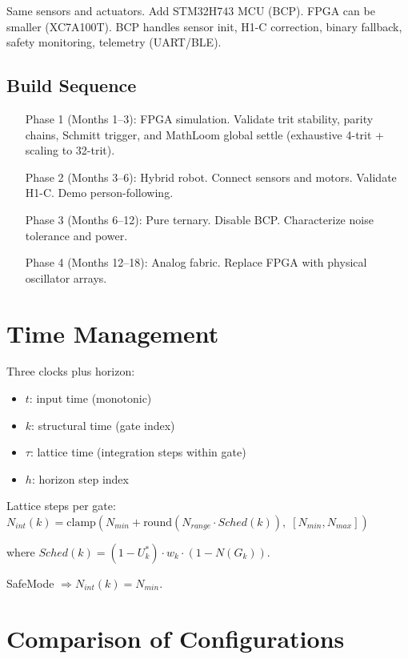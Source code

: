 \documentclass[11pt, a4paper]{report}
\begin{document}
Same sensors and actuators. Add STM32H743 MCU (BCP). FPGA can be smaller
(XC7A100T). BCP handles sensor init, H1-C correction, binary fallback,
safety monitoring, telemetry (UART/BLE).

\section{Build Sequence}

\begin{enumerate}[label=\textbf{Phase \arabic*} (Months \arabic*--\arabic*):, start=1]
  \item[Phase 1 (Months 1--3):] FPGA simulation. Validate trit stability, parity chains, Schmitt trigger, and MathLoom global settle (exhaustive 4-trit + scaling to 32-trit).
  \item[Phase 2 (Months 3--6):] Hybrid robot. Connect sensors and motors. Validate H1-C. Demo person-following.
  \item[Phase 3 (Months 6--12):] Pure ternary. Disable BCP. Characterize noise tolerance and power.
  \item[Phase 4 (Months 12--18):] Analog fabric. Replace FPGA with physical oscillator arrays.
\end{enumerate}

\chapter{Time Management}

Three clocks plus horizon:
\begin{itemize}[nosep]
  \item $t$: input time (monotonic)
  \item $k$: structural time (gate index)
  \item $\tau$: lattice time (integration steps within gate)
  \item $h$: horizon step index
\end{itemize}

Lattice steps per gate:
$N_{int}(k) = \text{clamp}(N_{min} + \text{round}(N_{range} \cdot Sched(k)),\; [N_{min}, N_{max}])$

where $Sched(k) = (1 - U^*_k) \cdot w_k \cdot (1 - N(G_k))$.

SafeMode $\Rightarrow N_{int}(k) = N_{min}$.

\chapter{Comparison of Configurations}
\end{document}
